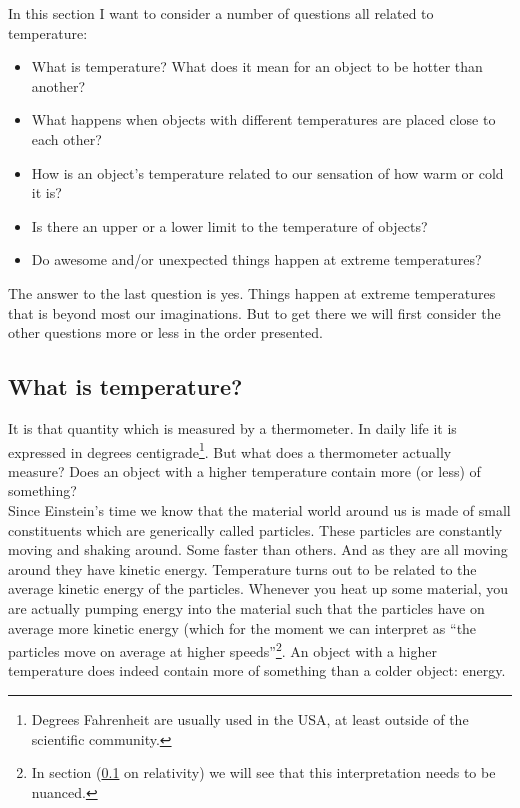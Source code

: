 \noindent In this section I want to consider a number of questions all related to temperature:
\begin{itemize}
\item What is temperature? What does it mean for an object to be hotter than another?
\item What happens when objects with different temperatures are placed close to each other?
\item How is an object's temperature related to our sensation of how warm or cold it is?
\item Is there an upper or a lower limit to the temperature of objects?
\item Do awesome and/or unexpected things happen at extreme temperatures?
\end{itemize}
The answer to the last question is yes. Things happen at extreme temperatures that is beyond most our imaginations. But to get there we will first consider the other questions more or less in the order presented.

\subsection{What is temperature?}

\noindent It is that quantity which is measured by a thermometer. In daily life it is expressed in degrees centigrade\footnote{Degrees Fahrenheit are usually used in the USA, at least outside of the scientific community.}. But what does a thermometer actually measure? Does an object with a higher temperature contain more (or less) of something?\\

\noindent Since Einstein's time we know that the material world around us is made of small constituents which are generically called particles. These particles are constantly moving and shaking around. Some faster than others. And as they are all moving around they have kinetic energy. Temperature turns out to be related to the average kinetic energy of the particles. Whenever you heat up some material, you are actually pumping energy into the material such that the particles have on average more kinetic energy (which for the moment we can interpret as "`the particles move on average at higher speeds"'\footnote{In section (\ref{} on relativity) we will see that this interpretation needs to be nuanced.}. An object with a higher temperature does indeed contain more of something than a colder object: energy.\\

